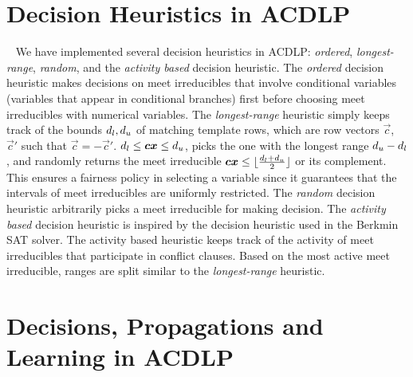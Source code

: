 \section{Decision Heuristics in ACDLP}~\label{decision}
%
We have implemented several decision heuristics in ACDLP: {\em ordered}, 
{\em longest-range}, {\em random}, and the {\em activity based} 
decision heuristic.  The {\em ordered} decision heuristic 
makes decisions on meet irreducibles that involve conditional 
variables (variables that appear in conditional branches) first 
before choosing meet irreducibles with numerical variables.  
%
The {\em longest-range} heuristic simply keeps track of the bounds
$d_l,d_u$ of matching template rows, which are 
row vectors $\vec{c}$, $\vec{c}'$ such that $\vec{c}=-\vec{c}'$.
$d_l\leq {\boldsymbol c}{\boldsymbol x}\leq d_u$, picks the one with the longest range
$d_u-d_l$, and randomly returns the meet irreducible
${\boldsymbol c}{\boldsymbol x}\leq
\lfloor\frac{d_l+d_u}{2}\rfloor$ or its
complement. This ensures a fairness policy in selecting a variable
since it guarantees that the intervals of meet irreducibles are
uniformly restricted.
%
The {\em random} decision heuristic arbitrarily picks a meet irreducible  
for making decision. 
%
%
The {\em activity based} decision heuristic is inspired by the 
decision heuristic used in the Berkmin SAT solver.  
The activity based heuristic %
keeps track of the activity of meet irreducibles that 
participate in conflict clauses.  Based on the most 
active meet irreducible, ranges are split similar to 
the {\em longest-range} heuristic.
%
\section{Decisions, Propagations and Learning in ACDLP}
%

%
